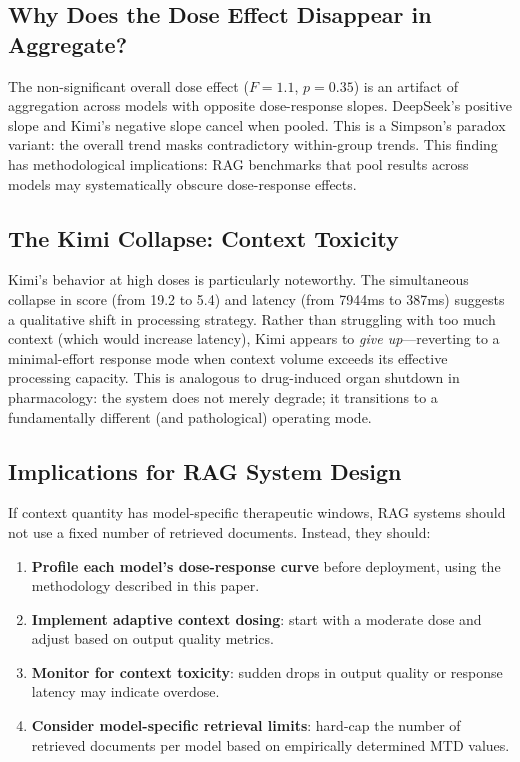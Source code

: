 \documentclass[11pt,a4paper]{article}
\begin{document}
\subsection{Why Does the Dose Effect Disappear in Aggregate?}

The non-significant overall dose effect ($F = 1.1$, $p = 0.35$) is an artifact of aggregation across models with opposite dose-response slopes. DeepSeek's positive slope and Kimi's negative slope cancel when pooled. This is a Simpson's paradox variant: the overall trend masks contradictory within-group trends. This finding has methodological implications: RAG benchmarks that pool results across models may systematically obscure dose-response effects.

\subsection{The Kimi Collapse: Context Toxicity}

Kimi's behavior at high doses is particularly noteworthy. The simultaneous collapse in score (from 19.2 to 5.4) and latency (from 7944ms to 387ms) suggests a qualitative shift in processing strategy. Rather than struggling with too much context (which would increase latency), Kimi appears to \emph{give up}---reverting to a minimal-effort response mode when context volume exceeds its effective processing capacity. This is analogous to drug-induced organ shutdown in pharmacology: the system does not merely degrade; it transitions to a fundamentally different (and pathological) operating mode.

\subsection{Implications for RAG System Design}

If context quantity has model-specific therapeutic windows, RAG systems should not use a fixed number of retrieved documents. Instead, they should:
\begin{enumerate}[leftmargin=*, itemsep=2pt]
  \item \textbf{Profile each model's dose-response curve} before deployment, using the methodology described in this paper.
  \item \textbf{Implement adaptive context dosing}: start with a moderate dose and adjust based on output quality metrics.
  \item \textbf{Monitor for context toxicity}: sudden drops in output quality or response latency may indicate overdose.
  \item \textbf{Consider model-specific retrieval limits}: hard-cap the number of retrieved documents per model based on empirically determined MTD values.
\end{enumerate}
\end{document}
